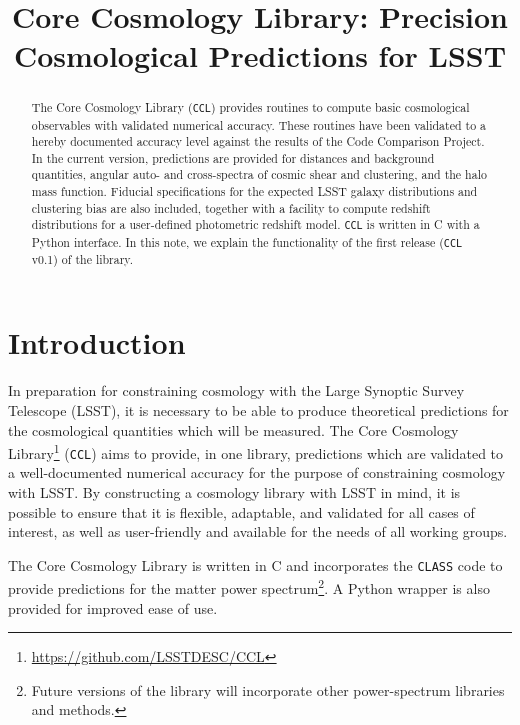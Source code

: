 \documentclass[\docopts]{\docclass}
\begin{document}
\title{Core Cosmology Library: Precision Cosmological Predictions for LSST}

\maketitlepre

\begin{abstract}

The Core Cosmology Library ({\tt CCL}) provides routines to compute basic cosmological observables with validated numerical accuracy. These routines have been validated to a hereby documented accuracy level against the results of the Code Comparison Project. In the current version, predictions are provided for distances and background quantities, angular auto- and cross-spectra of cosmic shear and clustering, and the halo mass function. Fiducial specifications for the expected LSST galaxy distributions and clustering bias are also included, together with a facility to compute redshift distributions for a user-defined photometric redshift model. {\tt CCL} is written in C with a Python interface. In this note, we explain the functionality of the first release ({\tt CCL} v0.1) of the library.

\end{abstract}


\maketitlepost

\newpage
\tableofcontents{}
\newpage

\section{Introduction}
\label{sec:intro}

In preparation for constraining cosmology with the Large Synoptic Survey Telescope (LSST), it is necessary to be able to produce theoretical predictions for the cosmological quantities which will be measured. The Core Cosmology Library\footnote{\url{https://github.com/LSSTDESC/CCL}} ({\tt CCL}) aims to provide, in one library, predictions which are validated to a well-documented numerical accuracy for the purpose of constraining cosmology with LSST. By constructing a cosmology library with LSST in mind, it is possible to ensure that it is flexible, adaptable, and validated for all cases of interest, as well as user-friendly and available for the needs of all working groups.

The Core Cosmology Library is written in C and incorporates the {\tt CLASS} code \cite{class} to provide predictions for the matter power spectrum\footnote{Future versions of the library will incorporate other power-spectrum libraries and methods.}. A Python wrapper is also provided for improved ease of use.
\end{document}
